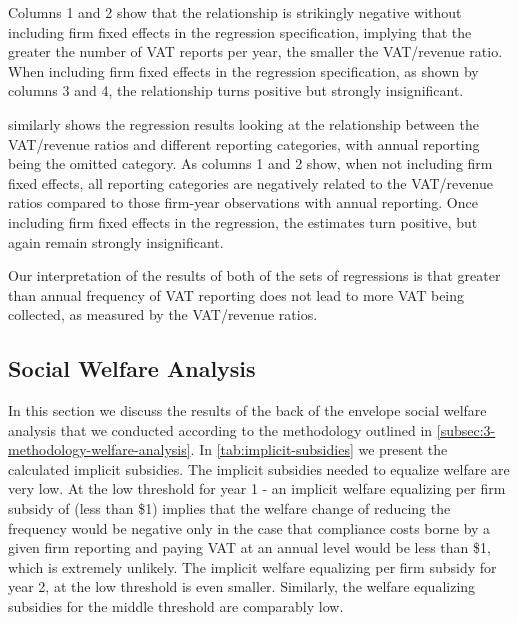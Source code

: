 Columns 1 and 2 show that the relationship is strikingly negative without including firm fixed effects in the regression specification, implying that the greater the number of
VAT reports per year, the smaller the VAT/revenue ratio. When including firm fixed effects in the regression specification, as shown by columns 3 and 4, the relationship turns positive but strongly insignificant.

\begin{table}[t]
\end{table}

 similarly shows the regression results looking at the relationship between the VAT/revenue ratios and different reporting categories, with annual reporting being the omitted category. As columns 1 and 2 show, when not including firm fixed effects, all reporting categories are negatively related to the VAT/revenue ratios compared to those firm-year observations with annual reporting. Once including firm fixed effects in the regression, the estimates turn positive, but again remain strongly insignificant.

Our interpretation of the results of both of the sets of regressions is that greater than annual frequency of VAT reporting does not lead to more VAT being collected, as measured by the VAT/revenue ratios.

\subsection{Social Welfare Analysis}
\label{subsec:3-results-social-welfare}
In this section we discuss the results of the back of the envelope social welfare analysis that we conducted according to the methodology outlined in \cref{subsec:3-methodology-welfare-analysis}. In \cref{tab:implicit-subsidies} we present the calculated implicit subsidies. The implicit subsidies needed to equalize welfare are very low. At the low threshold for year 1 - an implicit welfare equalizing per firm subsidy of  (less than \$1) implies that the welfare change of reducing the frequency would be negative only in the case that compliance costs borne by a given firm reporting and paying VAT at an annual level would be less than \$1, which is extremely unlikely. The implicit welfare equalizing per firm subsidy for year 2, at the low threshold is even smaller. Similarly, the welfare equalizing subsidies for the middle threshold are comparably low. 

